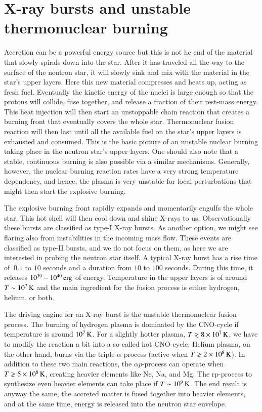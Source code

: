 \section{X-ray bursts and unstable thermonuclear burning}\label{sect:bursts}

Accretion can be a powerful energy source but this is not he end of the material that slowly spirals down into the star.
After it has traveled all the way to the surface of the neutron star, it will slowly sink and mix with the material in the star's upper layers.
Here this new material compresses and heats up, acting as fresh fuel.
Eventually the kinetic energy of the nuclei is large enough so that the protons will collide, fuse together, and release a fraction of their rest-mass energy.
This heat injection will then start an unstoppable chain reaction that creates a burning front that eventually covers the whole star.
Thermonuclear fusion reaction will then last until all the available fuel on the star's upper layers is exhausted and consumed.
This is the basic picture of an unstable nuclear burning taking place in the neutron star's upper layers.
One should also note that a stable, continuous burning is also possible via a similar mechanisms. 
Generally, however, the nuclear burning reaction rates have a very strong temperature dependency, and hence, the plasma is very unstable for local perturbations that might then start the explosive burning.

The explosive burning front rapidly expands and momentarily engulfs the whole star.
This hot shell will then cool down and shine X-rays to us.
Observationally these bursts are classified as type-I X-ray bursts.\cite[see e.g.,][for a review]{Lewin93, SB10}
As another option, we might see flaring also from instabilities in the incoming mass flow. 
These events are classified as type-II bursts, and we do not focus on them, as here we are interested in probing the neutron star itself.
A typical X-ray burst has a rise time of $~0.1$ to $10$ seconds and a duration from $10$ to $100$ seconds.
During this time, it releases $10^{39} - 10^{40} \, \mathrm{erg}$ of energy.
Temperature in the upper layers is of around $T \sim 10^7 \, \mathrm{K}$ and the main ingredient for the fusion process is either hydrogen, helium, or both.

The driving engine for an X-ray burst is the unstable thermonuclear fusion process.\cite{Fujimoto81, Wallace81, Fisker08}
The burning of hydrogen plasma is dominated by the CNO-cycle if temperature is around $10^7 \, \mathrm{K}$.
For a slightly hotter plasma, $T \gtrsim 8 \times 10^{7} \, \mathrm{K}$, we have to modify the reaction a bit into a so-called hot CNO-cycle.\cite{FH65}
Helium plasma, on the other hand, burns via the triple-$\alpha$ process (active when $T \gtrsim 2 \times 10^{8} \, \mathrm{K}$).
In addition to these two main reactions, the $\alpha p$-process can operate when $T \gtrsim 5 \times 10^{8} \, \mathrm{K}$, creating heavier elements like Ne, Na, and Mg.
The rp-process to synthesize even heavier elements can take place if $T \sim 10^9 \, \mathrm{K}$.
The end result is anyway the same, the accreted matter is fused together into heavier elements, and at the same time, energy is released into the neutron star envelope.

